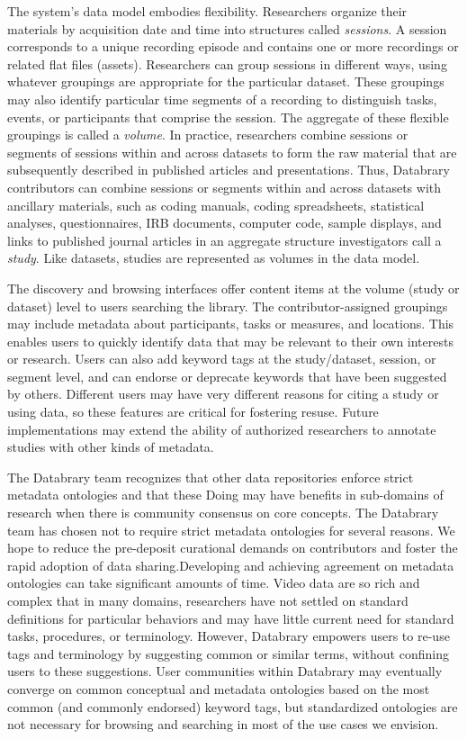 \documentclass[letterpaper,man,apacite]{apa6}
\begin{document}
The system's data model embodies flexibility. 
Researchers organize their materials by acquisition date and time into structures called \emph{sessions}.
A session corresponds to a unique recording episode and contains one or more recordings or related flat files (assets). 
Researchers can group sessions in different ways, using whatever groupings are appropriate for
the particular dataset. 
These groupings may also identify particular time segments of a recording to distinguish tasks, events, or
participants that comprise the session. 
The aggregate of these flexible groupings is called a \emph{volume}. 
In practice, researchers combine sessions or segments of sessions within and across datasets to form the raw material that are subsequently described in published articles and presentations. 
Thus, Databrary contributors can combine sessions or segments within and across datasets with ancillary
materials, such as coding manuals, coding spreadsheets, statistical analyses, questionnaires, IRB documents, computer code, sample displays, and links to published journal articles in an aggregate structure investigators call a \emph{study}. 
Like datasets, studies are represented as volumes in the data model.

The discovery and browsing interfaces offer content items at the volume (study or dataset) level to users searching the library. 
The contributor-assigned groupings may include metadata about participants, tasks or measures, and locations.
This enables users to quickly identify data that may be relevant to their own interests or research.
Users can also add keyword tags at the study/dataset, session, or segment level, and can endorse or deprecate keywords that have been suggested by others. 
Different users may have very different reasons for citing a study or using data, so these features are critical for fostering resuse. 
Future implementations may extend the ability of authorized researchers to annotate studies with other kinds of metadata.

The Databrary team recognizes that other data repositories enforce strict metadata ontologies and that these Doing may have benefits in sub-domains of research when there is community consensus on core concepts. 
The Databrary team has chosen not to require strict metadata ontologies for several reasons. 
We hope to reduce the pre-deposit curational demands on contributors and foster the rapid adoption of data sharing.Developing and achieving agreement on metadata ontologies can take significant amounts of time. 
Video data are so rich and complex that in many domains, researchers have not settled on standard definitions for particular behaviors and may have little current need for standard tasks, procedures, or terminology. 
However, Databrary empowers users to re-use tags and terminology by suggesting common or similar terms, without confining users to these suggestions. 
User communities within Databrary may eventually converge on common conceptual and metadata ontologies based on the most common (and commonly endorsed) keyword tags, but standardized ontologies are not necessary for browsing and searching in most of the use cases we envision.
\end{document}
